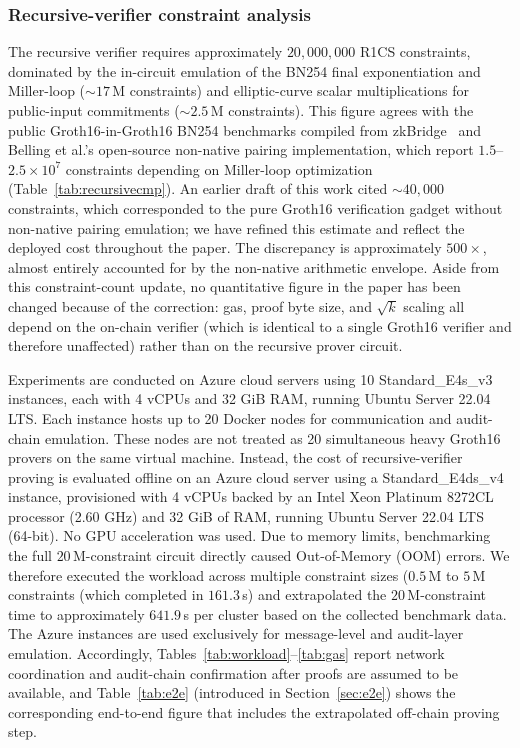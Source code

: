 \documentclass[journal]{IEEEtran}
\begin{document}
\subsubsection{Recursive-verifier constraint analysis}
\label{sec:circuitanalysis}
The recursive verifier requires approximately $20{,}000{,}000$ R1CS constraints, dominated by the in-circuit emulation of the BN254 final exponentiation and Miller-loop ($\sim 17$\,M constraints) and elliptic-curve scalar multiplications for public-input commitments ($\sim 2.5$\,M constraints). This figure agrees with the public Groth16-in-Groth16 BN254 benchmarks compiled from zkBridge~\cite{xie2022zkbridge} and Belling et al.'s open-source non-native pairing implementation, which report $1.5$--$2.5\times 10^7$ constraints depending on Miller-loop optimization (Table~\ref{tab:recursivecmp}). An earlier draft of this work cited $\sim 40{,}000$ constraints, which corresponded to the {pure} Groth16 verification gadget without non-native pairing emulation; we have refined this estimate and reflect the deployed cost throughout the paper. The discrepancy is approximately $500\times$, almost entirely accounted for by the non-native arithmetic envelope. Aside from this constraint-count update, no quantitative figure in the paper has been changed because of the correction: gas, proof byte size, and $\sqrt{k}$ scaling all depend on the on-chain verifier (which is identical to a single Groth16 verifier and therefore unaffected) rather than on the recursive prover circuit.

Experiments are conducted on Azure cloud servers using 10 Standard\_E4s\_v3 instances, each with 4 vCPUs and 32 GiB RAM, running Ubuntu Server 22.04 LTS. Each instance hosts up to 20 Docker nodes for communication and audit-chain emulation. These nodes are not treated as 20 simultaneous heavy Groth16 provers on the same virtual machine. Instead, the cost of recursive-verifier proving is evaluated offline on an Azure cloud server using a Standard\_E4ds\_v4 instance, provisioned with 4 vCPUs backed by an Intel Xeon Platinum 8272CL processor (2.60 GHz) and 32 GiB of RAM, running Ubuntu Server 22.04 LTS (64-bit). No GPU acceleration was used. Due to memory limits, benchmarking the full $20\,$M-constraint circuit directly caused Out-of-Memory (OOM) errors. We therefore executed the workload across multiple constraint sizes ($0.5\,$M to $5\,$M constraints (which completed in $161.3\,$s) and extrapolated the $20\,$M-constraint time to approximately $641.9\,$s per cluster based on the collected benchmark data. The Azure instances are used exclusively for message-level and audit-layer emulation. Accordingly, Tables~\ref{tab:workload}--\ref{tab:gas} report network coordination and audit-chain confirmation after proofs are assumed to be available, and Table~\ref{tab:e2e} (introduced in Section~\ref{sec:e2e}) shows the corresponding end-to-end figure that includes the extrapolated off-chain proving step.
\end{document}
